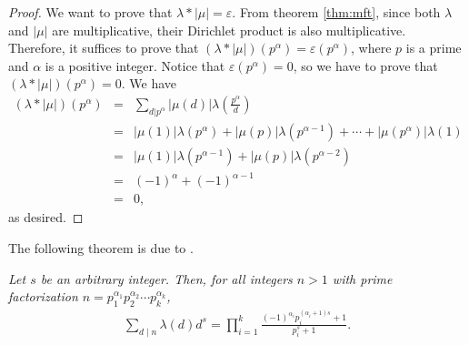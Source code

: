 \documentclass[12pt]{subfile}
\begin{document}
		\begin{proof}
			We want to prove that $\lambda\ast |\mu| = \varepsilon$. From theorem \ref{thm:mft}, since both $\lambda$ and $|\mu|$ are multiplicative, their Dirichlet product is also multiplicative. Therefore, it suffices to prove that $(\lambda\ast |\mu|)(p^\alpha)=\varepsilon(p^\alpha )$, where $p$ is a prime and $\alpha$ is a positive integer. Notice that $\varepsilon(p^\alpha ) = 0$, so we have to prove that $(\lambda\ast |\mu|)(p^\alpha)=0$. We have
				\begin{eqnarray*}
					(\lambda\ast |\mu|)(p^\alpha)
						&=& \sum_{d|p^\alpha} |\mu(d)| \lambda\left(\frac{p^\alpha}{d}\right)\\
						&=& |\mu(1)|\lambda(p^{\alpha}) + |\mu(p)|\lambda(p^{\alpha -1}) + \cdots + |\mu(p^{\alpha})| \lambda(1)\\
						&=& |\mu(1)|\lambda(p^{\alpha-1}) + |\mu(p)|\lambda(p^{\alpha -2})\\
						&=& (-1)^{\alpha} + (-1)^{\alpha -1}\\
						&=& 0,
				\end{eqnarray*}
			as desired.
		\end{proof}
	The following theorem is due to \textcite[Chapter $\S$IV, Section $11$, Page $196-197$]{sierpinski_schinzel_1988}.

		\begin{theorem}\slshape\label{thm:liouville-sum-general}
			Let $s$ be an arbitrary integer. Then, for all integers $n >1$ with prime factorization $n= p_1^{\alpha_1} p_2^{\alpha_2} \cdots p_k^{\alpha_k}$,
				\begin{align*}
					\sum_{d\mid n} \lambda(d) d^s = \prod_{i=1}^{k} \frac{(-1)^{\alpha_i} p_i^{(\alpha_i+1)s} + 1}{p_i^s + 1}.
				\end{align*}
		\end{theorem}
\end{document}
